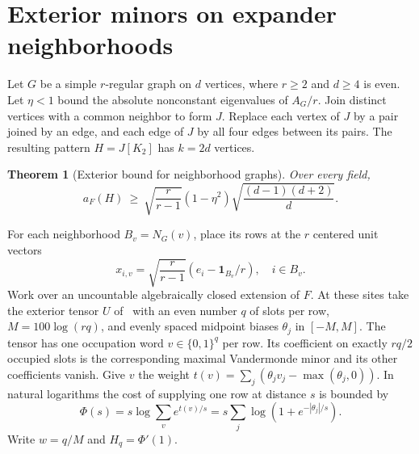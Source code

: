 \documentclass[11pt]{article}
\newtheorem{theorem}{Theorem}
\theoremstyle{remark}
\begin{document}
\section{Exterior minors on expander neighborhoods}\label{expanders}
Let $G$ be a simple $r$-regular graph on $d$ vertices, where $r\ge2$ and $d\ge4$ is even. Let $\eta<1$ bound the absolute nonconstant eigenvalues of $A_G/r$. Join distinct vertices with a common neighbor to form $J$. Replace each vertex of $J$ by a pair joined by an edge, and each edge of $J$ by all four edges between its pairs. The resulting pattern $H=J[K_2]$ has $k=2d$ vertices.
\begin{theorem}[Exterior bound for neighborhood graphs]\label{expbound}
Over every field,
\[
 a_F(H)\ \ge\ \sqrt{\frac r{r-1}}(1-\eta^2)
                \sqrt{\frac{(d-1)(d+2)}d}.
\]
\end{theorem}
For each neighborhood $B_v=N_G(v)$, place its rows at the $r$ centered unit vectors
\[
 x_{i,v}=\sqrt{\frac r{r-1}}(e_i-\mathbf1_{B_v}/r),\quad i\in B_v .
\]
Work over an uncountable algebraically closed extension of $F$. At these sites take the exterior tensor $U$ of~\cite{circuits} with an even number $q$ of slots per row, $M=100\log(rq)$, and evenly spaced midpoint biases $\theta_j$ in $[-M,M]$. The tensor has one occupation word $v\in\{0,1\}^q$ per row. Its coefficient on exactly $rq/2$ occupied slots is the corresponding maximal Vandermonde minor and its other coefficients vanish. Give $v$ the weight $t(v)=\sum_j(\theta_jv_j-\max(\theta_j,0))$. In natural logarithms the cost of supplying one row at distance $s$ is bounded by
\[
 \Phi(s)=s\log\sum_v e^{t(v)/s}
        =s\sum_j\log(1+e^{-|\theta_j|/s}).
\]
Write $w=q/M$ and $H_q=\Phi'(1)$.
\end{document}
